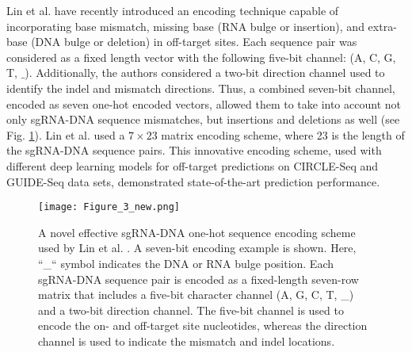 \documentclass[unnumsec,webpdf,contemporary,large]{oup-authoring-template}
\theoremstyle{thmstyleone}%
\theoremstyle{thmstyletwo}%
\theoremstyle{thmstylethree}%
\begin{document}
Lin et al. \cite{lin2020crispr} have recently introduced an encoding technique capable of incorporating base mismatch, missing base (RNA bulge or insertion), and extra-base (DNA bulge or deletion) in off-target sites. Each sequence pair was considered as a fixed length vector with the following five-bit channel: (A, C, G, T, $\_$). Additionally, the authors considered a two-bit direction channel used to identify the indel and mismatch directions. Thus, a combined seven-bit channel, encoded as seven one-hot encoded vectors, allowed them to take into account not only sgRNA-DNA sequence mismatches, but insertions and deletions as well (see Fig. \ref{fig:Encoding_Lin}). Lin et al. \cite{lin2020crispr} used a $7\times 23$ matrix encoding scheme, where 23 is the length of the sgRNA-DNA sequence pairs. This innovative encoding scheme, used with different deep learning models for off-target predictions on CIRCLE-Seq and GUIDE-Seq data sets, demonstrated state-of-the-art prediction performance.

\begin{figure}[b]
    \centering
    \vspace{-1.5em}
    \texttt{[image: Figure\_3\_new.png]}
    \caption{A novel effective sgRNA-DNA one-hot sequence encoding scheme used by Lin et al. \cite{lin2020crispr}. A seven-bit encoding example is shown. Here,  ``\_`` symbol indicates the DNA or RNA bulge position. Each sgRNA-DNA sequence pair is encoded as a fixed-length seven-row matrix that includes a five-bit character channel (A, G, C, T, \_) and a two-bit direction channel. The five-bit channel is used to encode the on- and off-target site nucleotides, whereas the direction channel is used to indicate the mismatch and indel locations.}
    \label{fig:Encoding_Lin}
\end{figure}
\end{document}
